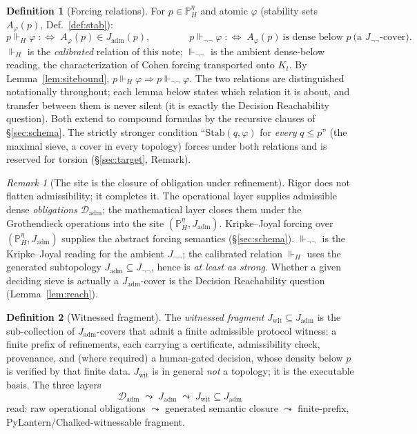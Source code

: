\documentclass[11pt]{article}
\theoremstyle{definition}
\newtheorem{definition}{Definition}
\theoremstyle{remark}
\newtheorem*{remark}{Remark}
\newcommand{\forcesH}{\Vdash_{H}}
\newcommand{\forcesnn}{\Vdash_{\neg\neg}}
\newcommand{\PHeta}{\mathbb{P}_{H}^{\eta}}
\newcommand{\refines}{\leq}
\newcommand{\Stab}{\mathrm{Stab}}
\newcommand{\Kt}{K_{t}}
\newcommand{\Dadm}{\mathcal{D}_{\mathrm{adm}}}
\newcommand{\Jadm}{J_{\mathrm{adm}}}
\newcommand{\Jwit}{J_{\mathrm{wit}}}
\newcommand{\Jnn}{J_{\neg\neg}}
\begin{document}
\begin{definition}[Forcing relations]\label{def:force}
For $p\in\PHeta$ and atomic $\varphi$ (stability sets $A_\varphi(p)$, Def.~\ref{def:stab}):
\[
  p \forcesH \varphi \;:\Longleftrightarrow\; A_\varphi(p)\in\Jadm(p),
  \qquad\qquad
  p \forcesnn \varphi \;:\Longleftrightarrow\; A_\varphi(p)\ \text{is dense below }p\ \text{(a }\Jnn\text{-cover)}.
\]
$\forcesH$ is the \emph{calibrated} relation of this note; $\forcesnn$ is the ambient dense-below
reading, the characterization of Cohen forcing transported onto $\Kt$. By
Lemma~\ref{lem:sitebound}, $p\forcesH\varphi\Rightarrow p\forcesnn\varphi$. The two relations are
distinguished notationally throughout; each lemma below states which relation it is about, and
transfer between them is never silent (it is exactly the Decision Reachability question). Both
extend to compound formulas by the recursive clauses of \S\ref{sec:schema}. The strictly stronger
condition ``$\Stab(q,\varphi)$ for \emph{every} $q\refines p$'' (the maximal sieve, a cover in
every topology) forces under both relations and is reserved for torsion (\S\ref{sec:target},
Remark).
\end{definition}

\begin{remark}[The site is the closure of obligation under refinement]
Rigor does not flatten admissibility; it completes it. The operational layer supplies admissible
dense \emph{obligations} $\Dadm$; the mathematical layer closes them under the Grothendieck operations
into the site $(\PHeta,\Jadm)$. Kripke--Joyal forcing over $(\PHeta,\Jadm)$ supplies the abstract
forcing semantics (\S\ref{sec:schema}). $\forcesnn$ is the Kripke--Joyal reading for the ambient
$\Jnn$; the calibrated relation $\forcesH$ uses the generated subtopology $\Jadm\subseteq\Jnn$,
hence is \emph{at least as strong}. Whether a given deciding sieve is actually a $\Jadm$-cover is
the Decision Reachability question (Lemma~\ref{lem:reach}).
\end{remark}

\begin{definition}[Witnessed fragment]\label{def:wit}
The \emph{witnessed fragment} $\Jwit\subseteq\Jadm$ is the sub-collection of $\Jadm$-covers that admit
a finite admissible protocol witness: a finite prefix of refinements, each carrying a certificate,
admissibility check, provenance, and (where required) a human-gated decision, whose density below $p$
is verified by that finite data. $\Jwit$ is in general \emph{not} a topology; it is the executable
basis. The three layers
\[
  \Dadm \;\leadsto\; \Jadm \;\leadsto\; \Jwit\subseteq\Jadm
\]
read: raw operational obligations $\leadsto$ generated semantic closure $\leadsto$ finite-prefix,
PyLantern/Chalked-witnessable fragment.
\end{definition}
\end{document}
